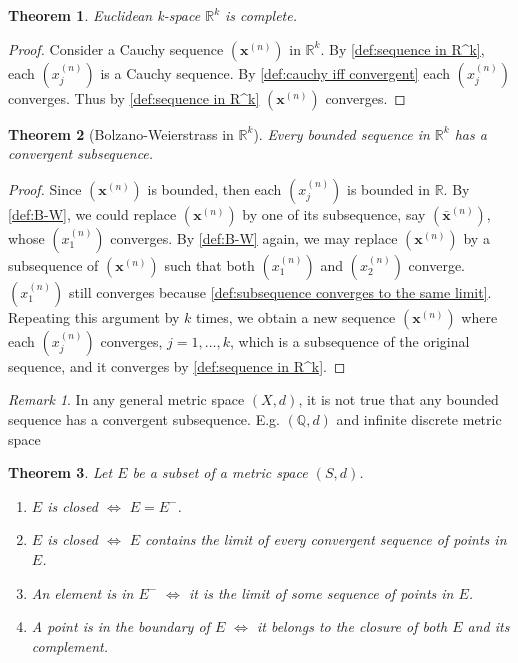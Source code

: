 \documentclass[12pt, lettersize]{book}
\theoremstyle{plain}
\newtheorem{thm}{Theorem}[section]
\theoremstyle{definition}
\theoremstyle{remark}
\newtheorem*{rem}{Remark}
\newcommand{\R}{\mathbb{R}}
\newcommand{\Q}{\mathbb{Q}}
\begin{document}
	\begin{thm}
		Euclidean k-space $\mathbb{R}^k$ is complete.
	\end{thm}
	\begin{proof}
		Consider a Cauchy sequence $(\textbf{x}^{(n)})$ in $\mathbb{R}^k$. By \ref{def:sequence in R^k}, each $(x_j^{(n)})$ is a Cauchy sequence. By \ref{def:cauchy iff convergent} each $(x_j^{(n)})$ converges. Thus by \ref{def:sequence in R^k} $(\textbf{x}^{(n)})$ converges.
	\end{proof}
	
	\begin{thm}[Bolzano-Weierstrass in $\R^k$]
		Every bounded sequence in $\mathbb{R}^k$ has a convergent subsequence.
	\end{thm}
	\begin{proof}
		Since $(\textbf{x}^{(n)})$ is bounded, then each $(x_j^{(n)})$ is bounded in $\mathbb{R}$. By \ref{def:B-W}, we
		could replace $(\textbf{x}^{(n)})$ by one of its subsequence, say $(\bar{\mathbf{x}}^{(n)})$, whose $(x_1^{(n)})$
		converges. By \ref{def:B-W} again, we may replace $(\textbf{x}^{(n)})$ by a subsequence of $(\textbf{x}^{(n)})$ such
		that both $(x_1^{(n)})$ and $(x_2^{(n)})$ converge. $(x_1^{(n)})$ still converges because \ref{def:subsequence converges to the same limit}. Repeating this argument by $k$ times, we obtain a new sequence $(\textbf{x}^{(n)})$ where each $(x_j^{(n)})$ converges, $j=1,\dots,k$, which is a subsequence of the original sequence, and it converges by \ref{def:sequence in R^k}. 
	\end{proof}
	\begin{rem}
		In any general metric space $(X,d)$, it is not true that any bounded sequence has a convergent subsequence. E.g. $(\Q,d)$ and infinite discrete metric space
	\end{rem}
	
	\begin{thm}
		Let $E$ be a subset of a metric space $(S,d)$.
		\begin{enumerate}
			\item $E$ is closed $\iff$ $E=E^-$.
			\item $E$ is closed $\iff$ $E$ contains the limit of every convergent sequence of points in $E$.
			\item An element is in $E^-$ $\iff$ it is the limit of some sequence of points in $E$.
			\item A point is in the boundary of $E$ $\iff$ it belongs to the closure of both $E$ and its complement.
		\end{enumerate}
	\end{thm}
	
\end{document}
